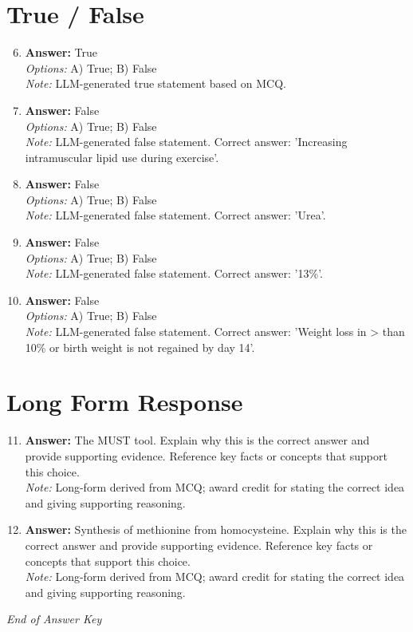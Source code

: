 \documentclass[12pt]{article}
\begin{document}
\section*{True / False}
\begin{enumerate}[label=\arabic*.]
\setcounter{enumi}{5}
\item \textbf{Answer:} True
\\ \textit{Options:} A) True; B) False
\\ \textit{Note:} LLM-generated true statement based on MCQ.
\item \textbf{Answer:} False
\\ \textit{Options:} A) True; B) False
\\ \textit{Note:} LLM-generated false statement. Correct answer: 'Increasing intramuscular lipid use during exercise'.
\item \textbf{Answer:} False
\\ \textit{Options:} A) True; B) False
\\ \textit{Note:} LLM-generated false statement. Correct answer: 'Urea'.
\item \textbf{Answer:} False
\\ \textit{Options:} A) True; B) False
\\ \textit{Note:} LLM-generated false statement. Correct answer: '13\%'.
\item \textbf{Answer:} False
\\ \textit{Options:} A) True; B) False
\\ \textit{Note:} LLM-generated false statement. Correct answer: 'Weight loss in \textgreater{} than 10\% or birth weight is not regained by day 14'.
\end{enumerate}

\section*{Long Form Response}
\begin{enumerate}[label=\arabic*.]
\setcounter{enumi}{10}
\item \textbf{Answer:} The MUST tool. Explain why this is the correct answer and provide supporting evidence. Reference key facts or concepts that support this choice.
\\ \textit{Note:} Long-form derived from MCQ; award credit for stating the correct idea and giving supporting reasoning.
\item \textbf{Answer:} Synthesis of methionine from homocysteine. Explain why this is the correct answer and provide supporting evidence. Reference key facts or concepts that support this choice.
\\ \textit{Note:} Long-form derived from MCQ; award credit for stating the correct idea and giving supporting reasoning.
\end{enumerate}

\vfill
\noindent\textit{End of Answer Key}
\end{document}
